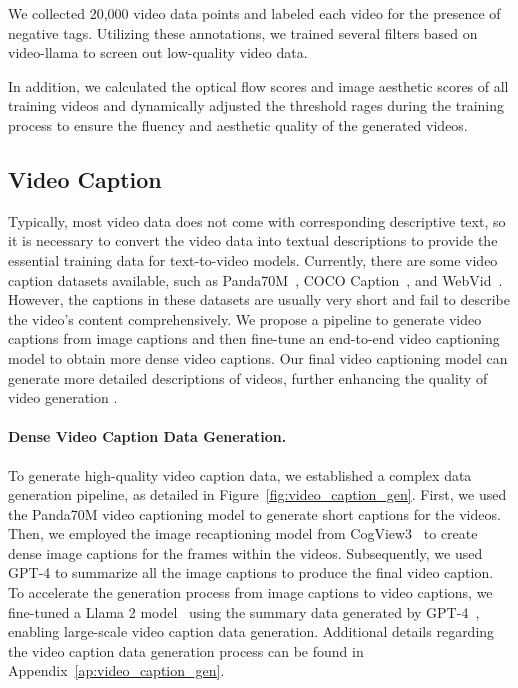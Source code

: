 We collected 20,000 video data points and labeled each video for the presence of negative tags. Utilizing these annotations, we trained several filters based on video-llama to screen out low-quality video data.

In addition, we calculated the optical flow scores and image aesthetic scores of all training videos and dynamically adjusted the threshold rages during the training process to ensure the fluency and aesthetic quality of the generated videos. 


\subsection{Video Caption}
Typically, most video data does not come with corresponding descriptive text, so it is necessary to convert the video data into textual descriptions to provide the essential training data for text-to-video models. Currently, there are some video caption datasets available, such as Panda70M~\citep{chen2024panda}, COCO Caption~\citep{lin2014microsoft}, and WebVid~\cite{bain2021frozen}. However, the captions in these datasets are usually very short and fail to describe the video's content comprehensively. We propose a pipeline to generate video captions from image captions and then fine-tune an end-to-end video captioning model to obtain more dense video captions. Our final video captioning model can generate more detailed descriptions of videos, further enhancing the quality of video generation \citep{betker2023improving}.




\paragraph{Dense Video Caption Data Generation.} To generate high-quality video caption data, we established a complex data generation pipeline, as detailed in Figure~\ref{fig:video_caption_gen}. First, we used the Panda70M video captioning model to generate short captions for the videos. Then, we employed the image recaptioning model from CogView3~\citep{zheng2024cogview3} to create dense image captions for the frames within the videos. Subsequently, we used GPT-4 to summarize all the image captions to produce the final video caption. To accelerate the generation process from image captions to video captions, we fine-tuned a Llama 2 model~\citep{touvron2023llama} using the summary data generated by GPT-4~\citep{GPT4}, enabling large-scale video caption data generation. Additional details regarding the video caption data generation process can be found in Appendix~\ref{ap:video_caption_gen}.


